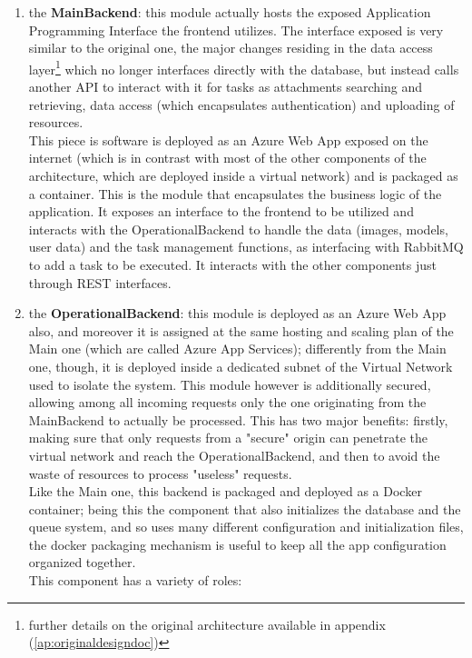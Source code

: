   \begin{enumerate}
    \item the \textbf{MainBackend}: this module actually hosts the exposed Application Programming Interface the frontend utilizes. The interface exposed is very similar to the original one, the major changes residing in the data access layer\footnote{further details on the original architecture available in appendix (\ref{ap:originaldesigndoc})} which no longer interfaces directly with the database, but instead calls another API to interact with it for tasks as attachments searching and retrieving, data access (which encapsulates authentication) and uploading of resources.\\
      This piece is software is deployed as an Azure Web App exposed on the internet (which is in contrast with most of the other components of the architecture, which are deployed inside a virtual network) and is packaged as a container. This is the module that encapsulates the business logic of the application. It exposes an interface to the frontend to be utilized and interacts with the OperationalBackend to handle the data (images, models, user data) and the task management functions, as interfacing with RabbitMQ to add a task to be executed. It interacts with the other components just through REST interfaces.
    \item the \textbf{OperationalBackend}: this module is deployed as an Azure Web App also, and moreover it is assigned at the same hosting and scaling plan of the Main one (which are called Azure App Services); differently from the Main one, though, it is deployed inside a dedicated subnet of the Virtual Network used to isolate the system. This module however is additionally secured, allowing among all incoming requests only the one originating from the MainBackend to actually be processed. This has two major benefits: firstly, making sure that only requests from a "secure" origin can penetrate the virtual network and reach the OperationalBackend, and then to avoid the waste of resources to process "useless" requests.\\
      Like the Main one, this backend is packaged and deployed as a Docker container; being this the component that also initializes the database and the queue system, and so uses many different configuration and initialization files, the docker packaging mechanism is useful to keep all the app configuration organized together.\\
      This component has a variety of roles:
      \begin{itemize}

\end{itemize}
\end{enumerate}
